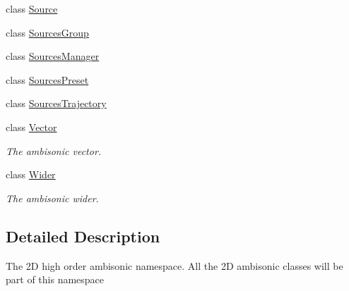 \begin{DoxyCompactItemize}
class \hyperlink{class_hoa2_d_1_1_source}{Source}
\item 
class \hyperlink{class_hoa2_d_1_1_sources_group}{Sources\-Group}
\item 
class \hyperlink{class_hoa2_d_1_1_sources_manager}{Sources\-Manager}
\item 
class \hyperlink{class_hoa2_d_1_1_sources_preset}{Sources\-Preset}
\item 
class \hyperlink{class_hoa2_d_1_1_sources_trajectory}{Sources\-Trajectory}
\item 
class \hyperlink{class_hoa2_d_1_1_vector}{Vector}
\begin{DoxyCompactList}\small\item\em The ambisonic vector. \end{DoxyCompactList}\item 
class \hyperlink{class_hoa2_d_1_1_wider}{Wider}
\begin{DoxyCompactList}\small\item\em The ambisonic wider. \end{DoxyCompactList}\end{DoxyCompactItemize}


\subsection{Detailed Description}
The 2\-D high order ambisonic namespace. All the 2\-D ambisonic classes will be part of this namespace 